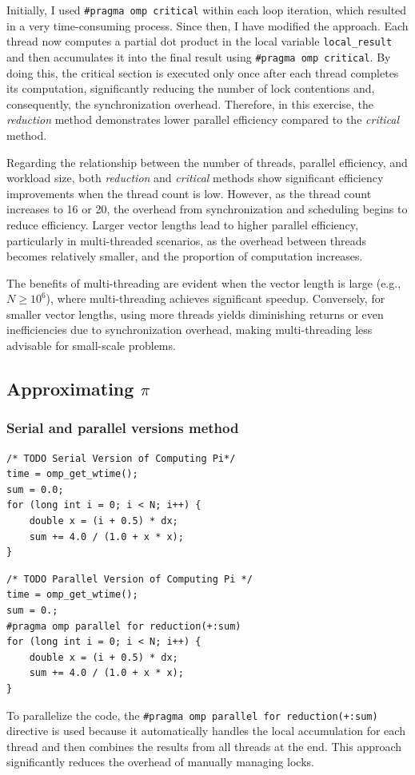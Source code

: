 \documentclass[unicode,11pt,a4paper,oneside,numbers=endperiod,openany]{scrartcl}
\begin{document}
Initially, I used \texttt{\#pragma omp critical} within each loop iteration, which resulted in a very time-consuming process. Since then, I have modified the approach. Each thread now computes a partial dot product in the local variable \texttt{local\_result} and then accumulates it into the final result using \texttt{\#pragma omp critical}. By doing this, the critical section is executed only once after each thread completes its computation, significantly reducing the number of lock contentions and, consequently, the synchronization overhead. Therefore, in this exercise, the \textit{reduction} method demonstrates lower parallel efficiency compared to the \textit{critical} method.

Regarding the relationship between the number of threads, parallel efficiency, and workload size, both \textit{reduction} and \textit{critical} methods show significant efficiency improvements when the thread count is low. However, as the thread count increases to 16 or 20, the overhead from synchronization and scheduling begins to reduce efficiency. Larger vector lengths lead to higher parallel efficiency, particularly in multi-threaded scenarios, as the overhead between threads becomes relatively smaller, and the proportion of computation increases.

The benefits of multi-threading are evident when the vector length is large (e.g., \( N \geq 10^6 \)), where multi-threading achieves significant speedup. Conversely, for smaller vector lengths, using more threads yields diminishing returns or even inefficiencies due to synchronization overhead, making multi-threading less advisable for small-scale problems.
\newpage

\subsection{Approximating $\pi$}
\subsubsection{Serial and parallel versions method}

\begin{lstlisting}[language=MyC++, style=mystyle, caption={Serial Version of Computing Pi}]
/* TODO Serial Version of Computing Pi*/
time = omp_get_wtime();
sum = 0.0;
for (long int i = 0; i < N; i++) {
    double x = (i + 0.5) * dx;
    sum += 4.0 / (1.0 + x * x);
}
\end{lstlisting}

\begin{lstlisting}[language=MyC++, style=mystyle, caption={Parallel Version of Computing Pi}]
/* TODO Parallel Version of Computing Pi */
time = omp_get_wtime();
sum = 0.;
#pragma omp parallel for reduction(+:sum)
for (long int i = 0; i < N; i++) {
    double x = (i + 0.5) * dx;
    sum += 4.0 / (1.0 + x * x);
}
\end{lstlisting}
To parallelize the code, the \texttt{\#pragma omp parallel for reduction(+:sum)} directive is used because it automatically handles the local accumulation for each thread and then combines the results from all threads at the end. This approach significantly reduces the overhead of manually managing locks.
\end{document}
